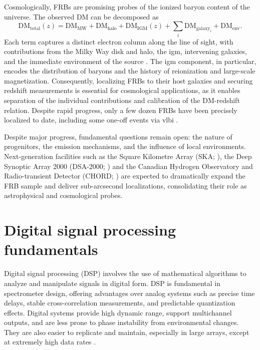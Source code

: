Cosmologically, FRBs are promising probes of the ionized baryon content of the universe. The observed DM can be decomposed as
\begin{equation}
	\mathrm{DM}_{\text{total}}(z) = \mathrm{DM}_{\text{MW}} + \mathrm{DM}_{\text{halo}} + \mathrm{DM}_{\text{IGM}}(z) + \sum_i \mathrm{DM}_{\text{galaxy}_i} + \mathrm{DM}_{\text{env}} .
	\label{eq:dm_total}
\end{equation}
Each term captures a distinct electron column along the line of sight, with contributions from the Milky Way disk and halo, the \gls{igm}, intervening galaxies, and the immediate environment of the source \citep{Macquart_2020}. The \gls{igm} component, in particular, encodes the distribution of baryons and the history of reionization and large-scale magnetization. Consequently, localizing FRBs to their host galaxies and securing redshift measurements is essential for cosmological applications, as it enables separation of the individual contributions and calibration of the DM-redshift relation. Despite rapid progress, only a few dozen FRBs have been precisely localized to date, including some one-off events via \gls{vlbi} \citep{Cassanelli_2024}.


Despite major progress, fundamental questions remain open: the nature of progenitors, the emission mechanisms, and the influence of local environments. Next-generation facilities such as the Square Kilometre Array (SKA; \citealt{Weltman_2020}), the Deep Synoptic Array 2000 (DSA-2000; \citealt{hallinan2019dsa2000radiosurvey}) and the Canadian Hydrogen Observatory and Radio-transient Detector (CHORD; \citealt{CHORD}) are expected to dramatically expand the FRB sample and deliver sub-arcsecond localizations, consolidating their role as astrophysical and cosmological probes.


\section{Digital signal processing fundamentals}
Digital signal processing (DSP) involves the use of mathematical algorithms to analyze and manipulate signals in digital form. DSP is fundamental in spectrometer design, offering advantages over analog systems such as precise time delays, stable cross-correlation measurements, and predictable quantization effects. Digital systems provide high dynamic range, support multichannel outputs, and are less prone to phase instability from environmental changes. They are also easier to replicate and maintain, especially in large arrays, except at extremely high data rates \citep{thompson2017interferometry}. 


